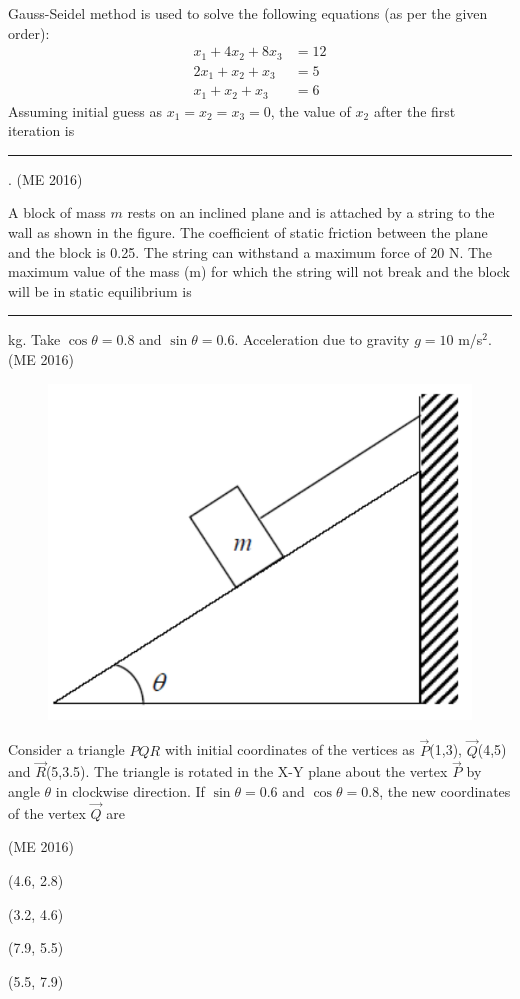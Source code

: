     \item Gauss-Seidel method is used to solve the following equations (as per the given order):
          \begin{align}
              x_1 + 4x_2 + 8x_3 & = 12 \\
              2x_1 + x_2 + x_3  & = 5  \\
              x_1 + x_2 + x_3   & = 6
          \end{align}
          Assuming initial guess as $x_1 = x_2 = x_3 = 0$, the value of $x_2$ after the first iteration is \rule{1cm}{0.01pt}.
	  \hfill(ME 2016)
    \item A block of mass $m$ rests on an inclined plane and is attached by a string to the wall as shown in the figure. The coefficient of static friction between the plane and the block is 0.25. The string can withstand a maximum force of 20 N. The maximum value of the mass (m) for which the string will not break and the block will be in static equilibrium is \rule{1cm}{0.01pt} kg.
          Take $\cos \theta = 0.8$ and $\sin \theta = 0.6$.
          Acceleration due to gravity $g = 10$ m/s$^2$.
	  \hfill(ME 2016)
          \begin{figure}[H]
              \centering
              \includegraphics[scale=0.3]{GATE/2016/ME/figs/q30}
              \caption{}
              \label{q30}
          \end{figure}
    \item Consider a triangle $PQR$ with initial coordinates of the vertices as $\vec{P}$(1,3), $\vec{Q}$(4,5) and $\vec{R}$(5,3.5). The triangle is rotated in the X-Y plane about the vertex $\vec{P}$ by angle $\theta$ in clockwise direction. If $\sin \theta = 0.6$ and $\cos \theta = 0.8$, the new coordinates of the vertex $\vec{Q}$ are

	  \hfill(ME 2016)
          \begin{enumerate}
              \begin{multicols}{4}

                  \item (4.6, 2.8)

                  \item (3.2, 4.6)

                  \item (7.9, 5.5)

                  \item (5.5, 7.9)

              \end{multicols}

          \end{enumerate}
